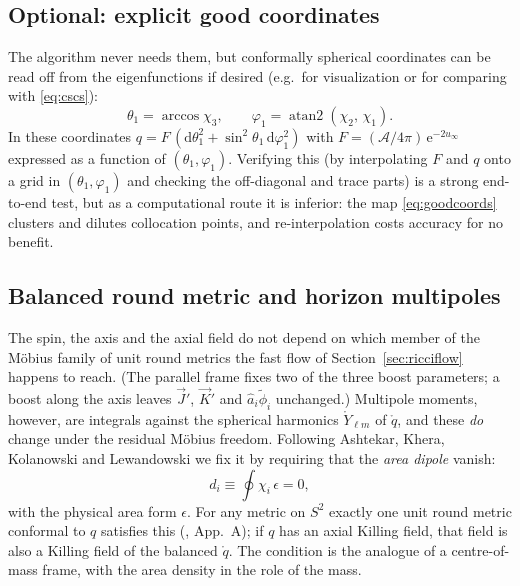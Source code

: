 \documentclass[11pt]{article}
\newcommand{\dd}{\mathrm{d}}
\newcommand{\ee}{\mathrm{e}}
\newcommand{\qo}{\mathring{q}}          %
\newcommand{\vJ}{\vec{J}}
\newcommand{\vK}{\vec{K}}
\newcommand{\atantwo}{\operatorname{atan2}}
\begin{document}
\subsection{Optional: explicit good coordinates}
\label{sec:goodcoords}

The algorithm never needs them, but conformally spherical coordinates can be
read off from the eigenfunctions if desired (e.g.\ for visualization or for
comparing with \eqref{eq:cscs}):
\begin{equation}
  \theta_1 = \arccos \chi_3,
  \qquad
  \varphi_1 = \atantwo(\chi_2,\,\chi_1).
  \label{eq:goodcoords}
\end{equation}
In these coordinates $q = F\,(\dd\theta_1^2 +
\sin^2\!\theta_1\,\dd\varphi_1^2)$ with
$F = (\mathcal{A}/4\pi)\,\ee^{-2u_\infty}$ expressed as a function of
$(\theta_1,\varphi_1)$.  Verifying this (by interpolating $F$ and $q$ onto a
grid in $(\theta_1,\varphi_1)$ and checking the off-diagonal and trace parts)
is a strong end-to-end test, but as a computational route it is inferior:
the map \eqref{eq:goodcoords} clusters and dilutes collocation points, and
re-interpolation costs accuracy for no benefit.

\subsection{Balanced round metric and horizon multipoles}
\label{sec:multipoles}

The spin, the axis and the axial field do not depend on which member of the
M\"obius family of unit round metrics the fast flow of
Section~\ref{sec:ricciflow} happens to reach.  (The parallel frame fixes two
of the three boost parameters; a boost along the axis leaves $\vJ'$, $\vK'$
and $\hat a_i\tilde\phi_i$ unchanged.)  Multipole moments, however, are
integrals against the spherical harmonics $\mathring Y_{\ell m}$ of $\qo$, and
these \emph{do} change under the residual M\"obius freedom.  Following
Ashtekar, Khera, Kolanowski and Lewandowski \cite{akkl2022} we fix it by
requiring that the \emph{area dipole} vanish:
\begin{equation*}
  d_i \equiv \oint \chi_i\,\epsilon = 0 ,
\end{equation*}
with the physical area form $\epsilon$.  For any metric on $S^2$ exactly one
unit round metric conformal to $q$ satisfies this (\cite{akkl2022}, App.~A);
if $q$ has an axial Killing field, that field is also a Killing field of the
balanced $\qo$.  The condition is the analogue of a centre-of-mass frame,
with the area density in the role of the mass.
\end{document}
